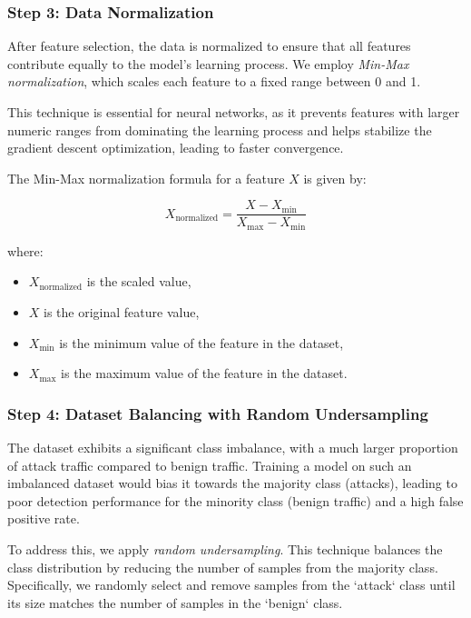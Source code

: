 \documentclass{report}
\begin{document}
\subsubsection{Step 3: Data Normalization}


After feature selection, the data is normalized to ensure that all features contribute equally to the model’s learning process. We employ \textit{Min-Max normalization}, which scales each feature to a fixed range between 0 and 1.

This technique is essential for neural networks, as it prevents features with larger numeric ranges from dominating the learning process and helps stabilize the gradient descent optimization, leading to faster convergence.

The Min-Max normalization formula for a feature \( X \) is given by:

\[
X_{\text{normalized}} = \frac{X - X_{\min}}{X_{\max} - X_{\min}}
\]

where:

\begin{itemize}
    \item \( X_{\text{normalized}} \) is the scaled value,
    \item \( X \) is the original feature value,
    \item \( X_{\min} \) is the minimum value of the feature in the dataset,
    \item \( X_{\max} \) is the maximum value of the feature in the dataset.
\end{itemize}

\subsubsection{Step 4: Dataset Balancing with Random Undersampling}

The dataset exhibits a significant class imbalance, with a much larger proportion of attack traffic compared to benign traffic. Training a model on such an imbalanced dataset would bias it towards the majority class (attacks), leading to poor detection performance for the minority class (benign traffic) and a high false positive rate.

To address this, we apply \textit{random undersampling}. This technique balances the class distribution by reducing the number of samples from the majority class. Specifically, we randomly select and remove samples from the `attack` class until its size matches the number of samples in the `benign` class.
\end{document}
